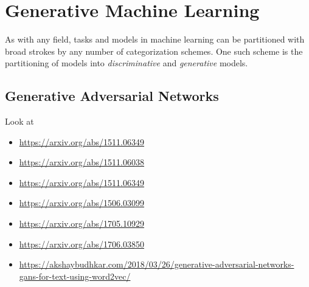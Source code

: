 \section{Generative Machine Learning}\label{introduction:generative-models}

As with any field, tasks and models in machine learning can be partitioned with broad strokes by any number of categorization schemes.
One such scheme is the partitioning of models into \textit{discriminative} and \textit{generative} models.


\subsection{Generative Adversarial Networks}\label{introduction:generative-models:gans}


Look at
\begin{itemize}
    \item \url{https://arxiv.org/abs/1511.06349}
    \item \url{https://arxiv.org/abs/1511.06038}
    \item \url{https://arxiv.org/abs/1511.06349}
    \item \url{https://arxiv.org/abs/1506.03099}
    \item \url{https://arxiv.org/abs/1705.10929}
    \item \url{https://arxiv.org/abs/1706.03850}
    \item \url{https://akshaybudhkar.com/2018/03/26/generative-adversarial-networks-gans-for-text-using-word2vec/}
\end{itemize}
